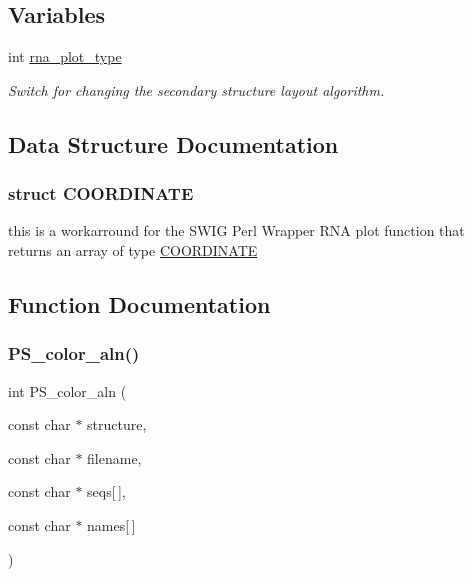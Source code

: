 \subsection*{Variables}
\begin{DoxyCompactItemize}
\item 
int \mbox{\hyperlink{group__plotting__utils__deprecated_ga5964c4581431b098b80027d6e14dcdd4}{rna\+\_\+plot\+\_\+type}}
\begin{DoxyCompactList}\small\item\em Switch for changing the secondary structure layout algorithm. \end{DoxyCompactList}\end{DoxyCompactItemize}


\subsection{Data Structure Documentation}
\label{structCOORDINATE}
\subsubsection{struct C\+O\+O\+R\+D\+I\+N\+A\+TE}
this is a workarround for the S\+W\+IG Perl Wrapper R\+NA plot function that returns an array of type \mbox{\hyperlink{group__plotting__utils__deprecated_structCOORDINATE}{C\+O\+O\+R\+D\+I\+N\+A\+TE}} 

\subsection{Function Documentation}
\mbox{\label{group__plotting__utils__deprecated_ga821802c3685e37e15182341f6217470d}} 
\subsubsection{\texorpdfstring{PS\_color\_aln()}{PS\_color\_aln()}}
{\footnotesize\ttfamily int P\+S\+\_\+color\+\_\+aln (\begin{DoxyParamCaption}\item[{const char $\ast$}]{structure,  }\item[{const char $\ast$}]{filename,  }\item[{const char $\ast$}]{seqs\mbox{[}$\,$\mbox{]},  }\item[{const char $\ast$}]{names\mbox{[}$\,$\mbox{]} }\end{DoxyParamCaption})}



